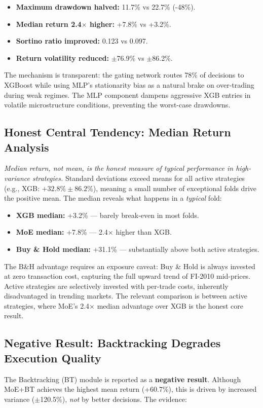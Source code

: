 \documentclass[conference]{IEEEtran}
\begin{document}
\begin{itemize}
    \item \textbf{Maximum drawdown halved:} 11.7\% vs 22.7\% (-48\%).
    \item \textbf{Median return 2.4$\times$ higher:} +7.8\% vs +3.2\%.
    \item \textbf{Sortino ratio improved:} 0.123 vs 0.097.
    \item \textbf{Return volatility reduced:} $\pm$76.9\% vs $\pm$86.2\%.
\end{itemize}

The mechanism is transparent: the gating network routes 78\% of decisions
to XGBoost while using MLP's stationarity bias as a natural brake on
over-trading during weak regimes. The MLP component dampens aggressive
XGB entries in volatile microstructure conditions, preventing the
worst-case drawdowns.

\subsection{Honest Central Tendency: Median Return Analysis}
\textit{Median return, not mean, is the honest measure of typical
performance in high-variance strategies.} Standard deviations exceed
means for all active strategies (e.g., XGB: $+32.8\% \pm 86.2\%$),
meaning a small number of exceptional folds drive the positive mean.
The median reveals what happens in a \textit{typical} fold:

\begin{itemize}
    \item \textbf{XGB median:} +3.2\% --- barely break-even in most folds.
    \item \textbf{MoE median:} +7.8\% --- 2.4$\times$ higher than XGB.
    \item \textbf{Buy \& Hold median:} +31.1\% --- substantially above both active strategies.
\end{itemize}

The B\&H advantage requires an exposure caveat: Buy \& Hold is always
invested at zero transaction cost, capturing the full upward trend of
FI-2010 mid-prices. Active strategies are selectively invested with
per-trade costs, inherently disadvantaged in trending markets. The
relevant comparison is between active strategies, where MoE's 2.4$\times$
median advantage over XGB is the honest core result.

\subsection{Negative Result: Backtracking Degrades Execution Quality}
\label{sec_bt_negative}
The Backtracking (BT) module is reported as a \textbf{negative result}.
Although MoE+BT achieves the highest mean return (+60.7\%), this is
driven by increased variance ($\pm$120.5\%), \textit{not} by better
decisions. The evidence:
\end{document}
